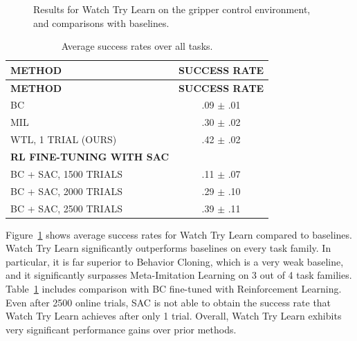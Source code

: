 \documentclass[
  letterpaper,
  numbers=noenddot,
  DIV=11,
  oneside]{scrreprt}
\theoremstyle{remark}
\begin{document}
\begin{figure}


\caption{\label{fig-watch-try-learn-results}Results for Watch Try Learn
on the gripper control environment, and comparisons with baselines.}

\end{figure}%

\begin{longtable}[]{@{}lc@{}}
\caption{Average success rates over all
tasks.}\label{tbl-watch-try-learn-table}\tabularnewline
\toprule\noalign{}
\textbf{METHOD} & \textbf{SUCCESS RATE} \\
\midrule\noalign{}
\endfirsthead
\toprule\noalign{}
\textbf{METHOD} & \textbf{SUCCESS RATE} \\
\midrule\noalign{}
\endhead
\bottomrule\noalign{}
\endlastfoot
BC & .09 \(\pm\) .01 \\
MIL & .30 \(\pm\) .02 \\
WTL, 1 TRIAL (OURS) & .42 \(\pm\) .02 \\
\textbf{RL FINE-TUNING WITH SAC} & \\
BC + SAC, 1500 TRIALS & .11 \(\pm\) .07 \\
BC + SAC, 2000 TRIALS & .29 \(\pm\) .10 \\
BC + SAC, 2500 TRIALS & .39 \(\pm\) .11 \\
\end{longtable}

Figure~\ref{fig-watch-try-learn-results} shows average success rates for
Watch Try Learn compared to baselines. Watch Try Learn significantly
outperforms baselines on every task family. In particular, it is far
superior to Behavior Cloning, which is a very weak baseline, and it
significantly surpasses Meta-Imitation Learning on 3 out of 4 task
families. Table~\ref{tbl-watch-try-learn-table} includes comparison with
BC fine-tuned with Reinforcement Learning. Even after 2500 online
trials, SAC is not able to obtain the success rate that Watch Try Learn
achieves after only 1 trial. Overall, Watch Try Learn exhibits very
significant performance gains over prior methods.
\end{document}

